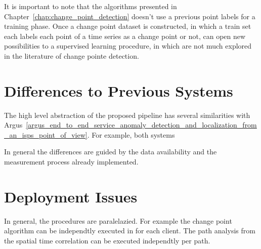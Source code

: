 It is important to note that the algorithms presented in
Chapter~\ref{chap:change_point_detection} doesn't use a previous point labels
for a training phase. Once a change point dataset is constructed, in which a
train set each labels each point of a time series as a change point or not, can
open new possibilities to a supervised learning procedure, in which are not
much explored in the literature of change pointe detection.

\section{Differences to Previous Systems}

The high level abstraction of the proposed pipeline has several similarities
with
Argus~\ref{argus_end_to_end_service_anomaly_detection_and_localization_from_an_isps_point_of_view}.
For example, both systems

In general the differences are guided by the data availability and the
measurement process already implemented.

\section{Deployment Issues}

In general, the procedures are paralelazied. For example the change point
algorithm can be independtly executed in for each client. The path analysis
from the spatial time correlation can be executed independtly per path.
